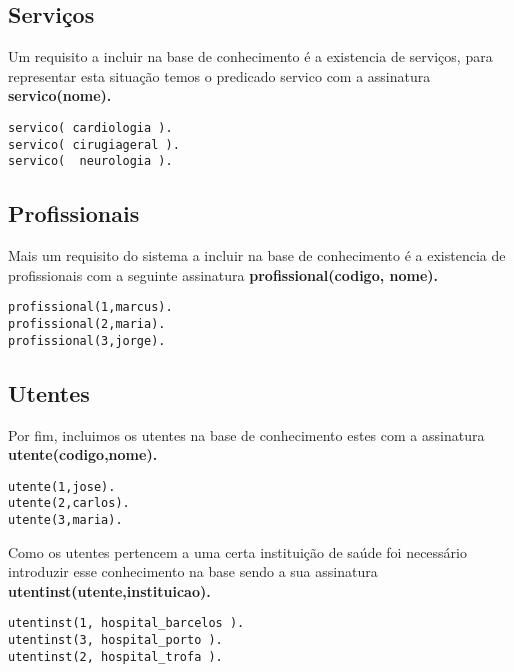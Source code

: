 \subsection{Serviços}
Um requisito a incluir na base de conhecimento é a existencia de serviços, para representar esta situação temos o predicado servico com a assinatura \textbf{servico(nome).}


\begin{Verbatim}
servico( cardiologia ). 
servico( cirugiageral ).
servico(  neurologia ).
\end{Verbatim}

\subsection{Profissionais}
Mais um requisito do sistema a incluir na base de conhecimento é a existencia de profissionais com a seguinte assinatura \textbf{profissional(codigo, nome).}


\begin{Verbatim}
profissional(1,marcus).
profissional(2,maria).
profissional(3,jorge).
\end{Verbatim}

\subsection{Utentes }
Por fim, incluimos os utentes na base de conhecimento estes com a assinatura \textbf{utente(codigo,nome).}

\begin{Verbatim}
utente(1,jose).  
utente(2,carlos). 
utente(3,maria). 
\end{Verbatim}

Como os utentes pertencem a uma certa instituição de saúde foi necessário introduzir esse conhecimento na base sendo a sua assinatura \textbf{utentinst(utente,instituicao).}

\begin{verbatim}
utentinst(1, hospital_barcelos ). 
utentinst(3, hospital_porto ).
utentinst(2, hospital_trofa ). 
\end{verbatim}
